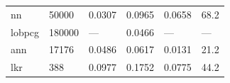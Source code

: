 \documentclass[final,twocolumn,12pt]{elsarticle}
\newcommand{\NA}{---} %
\begin{document}
\begin{table}[]
\begin{tabular}{@{}llllll@{}}
\gls{nn}                                                      & \num{50000}  & \num{0.0307} & \num{0.0965} & \num{0.0658} & \num{68.2} \\
\gls{lobpcg}   \cite{shenDeterminingGrainBoundary2019}        & \num{180000} & \NA          & \num{0.0466} & \NA          & \NA        \\
\gls{ann}   \cite{restrepoUsingArtificialNeural2014} & \num{17176}  & \num{0.0486} & \num{0.0617} & \num{0.0131} & \num{21.2} \\
\gls{lkr}   \cite{chesserLearningGrainBoundary2020}           & \num{388}    & \num{0.0977} & \num{0.1752} & \num{0.0775} & \num{44.2} \\ \bottomrule
\end{tabular}
\end{table}


\end{document}
